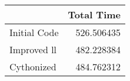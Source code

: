 \begin{tabular}{lr}
\toprule
{} &  Total Time \\
\midrule
Initial Code &  526.506435 \\
Improved ll  &  482.228384 \\
Cythonized   &  484.762312 \\
\bottomrule
\end{tabular}
